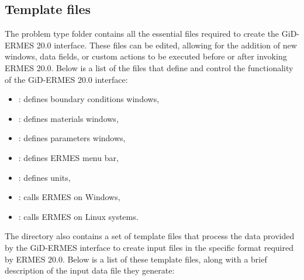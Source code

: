 \subsection{Template files}\label{ssTemplateFiles}

The problem type folder  contains all the essential files required to create the GiD-ERMES 20.0 interface. These files can be edited, allowing for the addition of new windows, data fields, or custom actions to be executed before or after invoking ERMES 20.0. Below is a list of the files that define and control the functionality of the GiD-ERMES 20.0 interface:
\begin{itemize}\itemsep0em 
	\item {}: defines boundary conditions windows,
	\item {}: defines materials windows,
	\item {}: defines parameters windows,
	\item {}: defines ERMES menu bar,
	\item {}: defines units,
	\item {}: calls ERMES on Windows,
	\item {}: calls ERMES on Linux systems.
\end{itemize}
The directory  also contains a set of  template files that process the data provided by the GiD-ERMES interface to create  input files in the specific format required by ERMES 20.0. Below is a list of these template files, along with a brief description of the input data file they generate:
